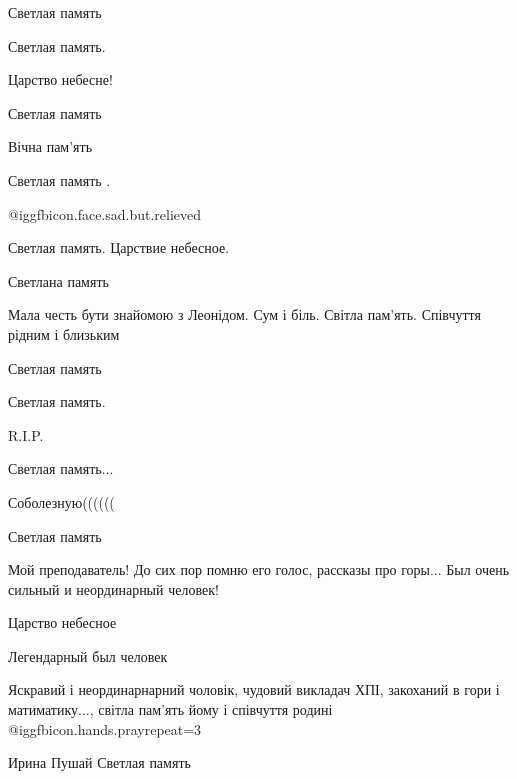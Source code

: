  
 
 
 
 
\zzSecCmt

\begin{itemize} %
Светлая память

Светлая память.

Царство небесне!

Светлая память

Вічна пам'ять

Светлая память .

 @igg{fbicon.face.sad.but.relieved} 

Светлая память.
Царствие небесное.

Светлана память

Мала честь бути знайомою з Леонідом.
Сум і біль. Світла пам'ять. Співчуття рідним і близьким

Светлая память

Светлая память.

R.I.P.

Светлая память...

Соболезную((((((

Светлая память

Мой преподаватель! До сих пор помню его голос, рассказы про горы...
Был очень сильный и неординарный человек!


Царство небесное

Легендарный был человек


Яскравий і неординарнарний чоловік, чудовий викладач ХПІ, закоханий в гори і
матиматику..., світла пам'ять йому і співчуття родині
@igg{fbicon.hands.pray}{repeat=3} 

Ирина Пушай
Светлая память


\end{itemize}
